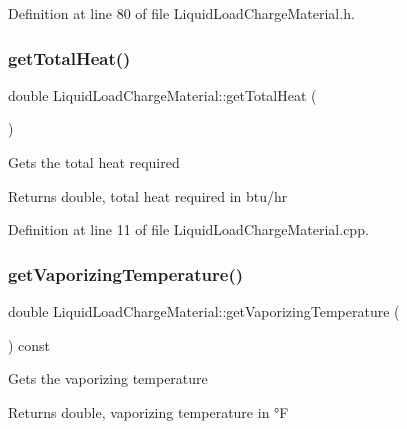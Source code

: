 Definition at line 80 of file Liquid\+Load\+Charge\+Material.\+h.

\mbox{\label{class_liquid_load_charge_material_a51a9826325e2c34cd073b8766331d476}} 
\subsubsection{\texorpdfstring{get\+Total\+Heat()}{getTotalHeat()}}
{\footnotesize\ttfamily double Liquid\+Load\+Charge\+Material\+::get\+Total\+Heat (\begin{DoxyParamCaption}{ }\end{DoxyParamCaption})}

Gets the total heat required

\begin{DoxyReturn}{Returns}
double, total heat required in btu/hr 
\end{DoxyReturn}


Definition at line 11 of file Liquid\+Load\+Charge\+Material.\+cpp.

\mbox{\label{class_liquid_load_charge_material_a07004e345fb4ff287d435d0c84027973}} 
\subsubsection{\texorpdfstring{get\+Vaporizing\+Temperature()}{getVaporizingTemperature()}}
{\footnotesize\ttfamily double Liquid\+Load\+Charge\+Material\+::get\+Vaporizing\+Temperature (\begin{DoxyParamCaption}{ }\end{DoxyParamCaption}) const\hspace{0.3cm}{\ttfamily [inline]}}

Gets the vaporizing temperature \begin{DoxyReturn}{Returns}
double, vaporizing temperature in °F 
\end{DoxyReturn}


